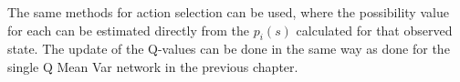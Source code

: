 \documentclass[12pt,a4paper]{report}
\newcommand\myworries[1]{\textcolor{red}{#1}}
\begin{document}
The same methods for action selection can be used, where the possibility value for each can be estimated directly from the $p_i(s)$ calculated for that observed state. The update of the Q-values can be done in the same way as done for the single Q Mean Var network in the previous chapter.  


%
%
\end{document}
